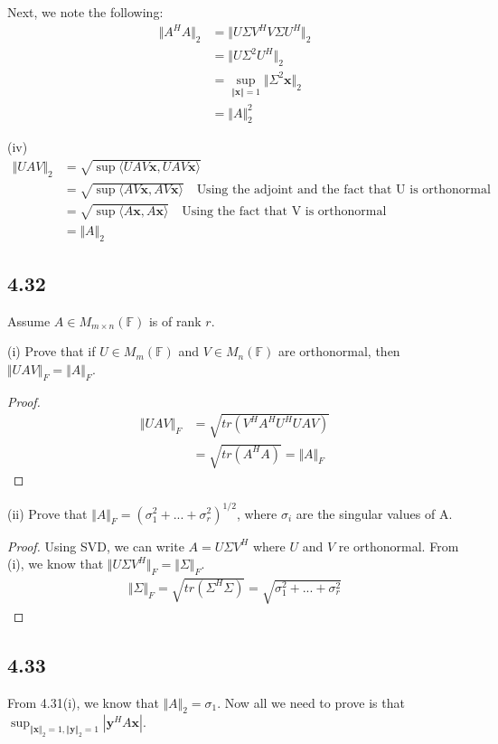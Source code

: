 \documentclass{article}
\newcommand{\inprod}[1]{\langle #1 \rangle}
\begin{document}
	Next, we note the following:
	\begin{align*}
	\Vert A^H A \Vert_2 &=  \Vert U \Sigma V^H V \Sigma U^H \Vert_2\\
	&= \Vert U \Sigma^2 U^H \Vert_2 \\
	&= \sup_{\Vert \mathbf{x} \Vert =1} \Vert \Sigma^2 \mathbf{x} \Vert_2 \\
	&= \Vert A \Vert_2^2
	\end{align*}
	
	(iv)
	\begin{align*}
	\Vert U A V \Vert_2 &= \sqrt{\sup \inprod{UAV \mathbf{x}, UAV \mathbf{x}}} \\
	&= \sqrt{\sup \inprod{AV \mathbf{x}, AV \mathbf{x}}} \quad \text{Using the adjoint and the fact that U is orthonormal}\\
	&= \sqrt{\sup \inprod{A \mathbf{x}, A \mathbf{x}}} \quad \text{Using the fact that V is orthonormal}\\
	&= \Vert A \Vert_2
	\end{align*}
	
	\subsection*{4.32}
	Assume $A \in M_{m \times n}(\mathbb{F})$ is of rank $r$.
	
	(i) Prove that if $U \in M_{m}(\mathbb{F})$ and $V \in M_{n}(\mathbb{F})$ are orthonormal, then $\Vert UAV \Vert_F = \Vert A \Vert_F$.
	\begin{proof}
		\begin{align*}
		\Vert UAV \Vert_F &= \sqrt{tr(V^H A^H U^H U A V)} \\
		&= \sqrt{tr(A^H A)} = \Vert A \Vert_F
		\end{align*}
	\end{proof}
	
	(ii) Prove that $\Vert A \Vert_F = (\sigma_1^2 + ... + \sigma_r^2)^{1/2}$, where $\sigma_i$ are the singular values of A.
	\begin{proof}
		Using SVD, we can write $A = U \Sigma V^H$ where $U$ and $V$ re orthonormal. From (i), we know that $\Vert U \Sigma V^H \Vert_F = \Vert \Sigma \Vert_F$.
		\begin{align*}
		\Vert \Sigma \Vert_F = \sqrt{tr(\Sigma^H \Sigma)} = \sqrt{\sigma_1^2 + ... + \sigma_r^2}
		\end{align*}
	\end{proof}
	
	
	\subsection*{4.33}
	From 4.31(i), we know that $\Vert A \Vert_2 = \sigma_1$. Now all we need to prove is that $\sup_{\Vert \mathbf{x} \Vert_2 = 1, \Vert \mathbf{y} \Vert_2 = 1} |\mathbf{y}^H A \mathbf{x}|$.
	
\end{document}
